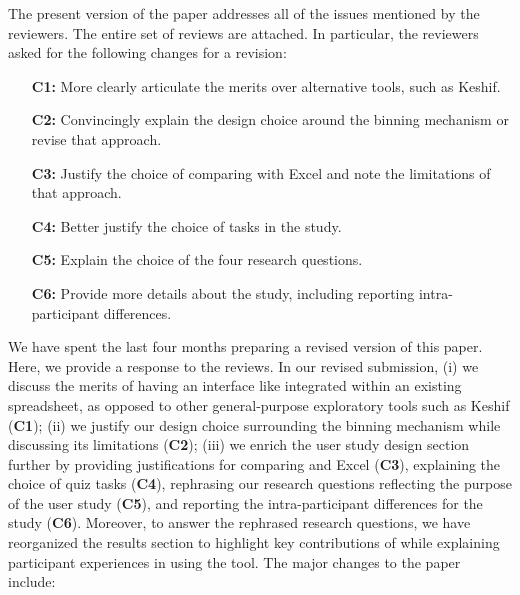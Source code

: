 The present version of the paper addresses all of the issues mentioned by the reviewers. The entire set of reviews are attached. In particular, the reviewers asked for the following changes for a revision: 
\begin{itemize}
    \item[\textbf{C1:}] More clearly articulate the merits over alternative tools, such as Keshif. 
     \item[\textbf{C2:}] Convincingly explain the design choice around the binning mechanism or revise
    that approach.
    \item[\textbf{C3:}] Justify the choice of comparing with Excel and note the limitations of that
    approach.
     \item[\textbf{C4:}] Better justify the choice of tasks in the study. 
     \item[\textbf{C5:}] Explain the choice of the four research questions.
     \item[\textbf{C6:}] Provide more details about the study, including reporting intra-participant
    differences.
\end{itemize} 
We have spent the last four months 
preparing a revised version of this paper.
Here, we provide a response to the reviews. 
In our revised submission,
(i) we discuss the merits of having an interface like \noah
integrated within an existing spreadsheet, as opposed
to other general-purpose exploratory tools such as  Keshif (\textbf{C1});
(ii) we justify our design choice surrounding the binning mechanism
while discussing its limitations (\textbf{C2}); 
(iii) we enrich the user study design section further 
by providing justifications for comparing \noah and Excel (\textbf{C3}), 
explaining the choice of quiz tasks (\textbf{C4}), rephrasing our research questions reflecting the purpose of the user study (\textbf{C5}), and reporting the intra-participant differences for the study (\textbf{C6}).
Moreover, to answer the rephrased research questions, we 
have reorganized the results section to highlight key contributions of \noah while explaining participant experiences in using the tool.
The major changes to the paper include:

